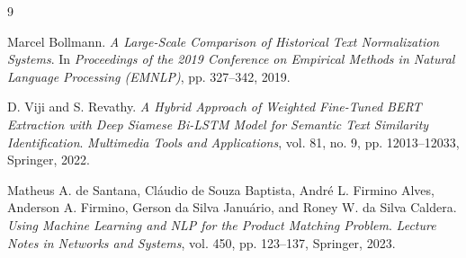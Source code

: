 \documentclass[12pt]{article}
\begin{document}
\begin{thebibliography}{9}

Marcel Bollmann.
\newblock \emph{A Large-Scale Comparison of Historical Text Normalization Systems}.
\newblock In \emph{Proceedings of the 2019 Conference on Empirical Methods in Natural Language Processing (EMNLP)}, pp. 327–342, 2019.

D. Viji and S. Revathy.
\newblock \emph{A Hybrid Approach of Weighted Fine-Tuned BERT Extraction with Deep Siamese Bi-LSTM Model for Semantic Text Similarity Identification}.
\newblock \emph{Multimedia Tools and Applications}, vol. 81, no. 9, pp. 12013–12033, Springer, 2022.

Matheus A. de Santana, Cláudio de Souza Baptista, André L. Firmino Alves, Anderson A. Firmino,  
Gerson da Silva Januário, and Roney W. da Silva Caldera.
\newblock \emph{Using Machine Learning and NLP for the Product Matching Problem}.
\newblock \emph{Lecture Notes in Networks and Systems}, vol. 450, pp. 123–137, Springer, 2023.

\end{thebibliography}
\end{document}
